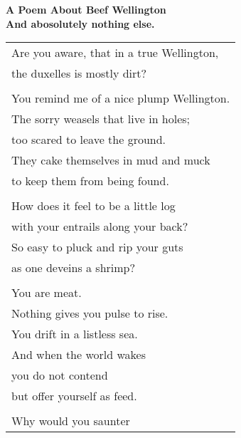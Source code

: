 \documentclass{article}
\begin{document}
\newcommand{\h}{\hspace*{4ex}}

%
%
%
%

\begin{center}
\textbf{A Poem About Beef Wellington} \\
{\small\textbf{And abosolutely nothing else.}} \\
\vspace*{2ex}
\begin{longtable}{l}
Are you aware, that in a true Wellington, \\
the duxelles is mostly dirt? \\
\\
You remind me of a nice plump Wellington. \\
The sorry weasels that live in holes; \\
too scared to leave the ground. \\
They cake themselves in mud and muck \\
to keep them from being found. \\
\\
How does it feel to be a little log \\
with your entrails along your back? \\
So easy to pluck and rip your guts \\
as one deveins a shrimp? \\
\\
You are meat. \\
Nothing gives you pulse to rise. \\
You drift in a listless sea. \\
And when the world wakes \\
you do not contend \\
but offer yourself as feed. \\
\\
Why would you saunter \\

\end{longtable}
\end{center}
\end{document}
